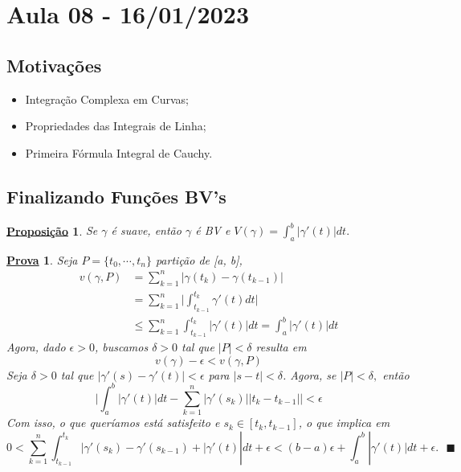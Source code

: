 \documentclass{article}
\newtheorem*{proof*}{\underline{Prova}}
\newtheorem*{prop*}{\underline{Proposi\c c\~ao}}
\renewcommand\qedsymbol{$\blacksquare$}
\begin{document}
\section{Aula 08 - 16/01/2023}
\subsection{Motiva\c c\~oes}
 \begin{itemize}
   \item Integra\c c\~ao Complexa em Curvas;
   \item Propriedades das Integrais de Linha;
   \item Primeira F\'ormula Integral de Cauchy.
 \end{itemize}
  \subsection{Finalizando Fun\c c\~oes BV's}
 \begin{prop*}
   Se $\gamma$ \'e suave, ent\~ao $\gamma$ \'e BV e $V(\gamma) = \int_{a}^{b}|\gamma'(t)|dt.$
 \end{prop*}
\begin{proof*}
  Seja $P=\{t_{0}, \cdots, t_n\} $ parti\c c\~ao de [a, b], 
  \begin{align*}
    v(\gamma, P) &= \sum\limits_{k=1}^{n}|\gamma(t_{k}) - \gamma(t_{k-1})|\\
                 &= \sum\limits_{k=1}^{n}\biggl|\int_{t_{k-1}}^{t_{k}}\gamma'(t)dt\biggr|\\
                 &\leq \sum\limits_{k=1}^{n}\int_{t_{k-1}}^{t_{k}}|\gamma'(t)|dt = \int_{a}^{b}|\gamma'(t)|dt
  \end{align*}
  Agora, dado $\epsilon > 0$, buscamos $\delta > 0$ tal que $|P| < \delta$ resulta em 
  $$
  v(\gamma) - \epsilon < v(\gamma, P)
  $$
  Seja $\delta > 0$ tal que $|\gamma'(s) - \gamma'(t)| < \epsilon$ para $|s - t| < \delta$. Agora, se $|P| < \delta,$ ent\~ao
  $$
  \biggl|\int_{a}^{b}|\gamma'(t)|dt - \sum\limits_{k=1}^{n}|\gamma'(s_{k})||t_{k}-t_{k-1}|\biggr| < \epsilon
  $$
  Com isso, o que quer\'iamos est\'a satisfeito e $s_{k}\in{[t_{k}, t_{k-1}]}$, o que implica em 
    $$
    0 < \sum\limits_{k=1}^{n}\int_{t_{k-1}}^{t_{k}}|\gamma'(s_{k}) - \gamma'(s_{k-1}) + |\gamma'(t)| dt + \epsilon < (b-a)\epsilon + 
    \int_{a}^{b}|\gamma'(t)|dt + \epsilon. \text{ \qedsymbol}
    $$
\end{proof*}
\end{document}
